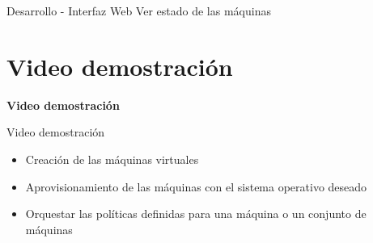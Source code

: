 \begin{frame}{Desarrollo - Interfaz Web}
    \vspace{0cm} {Ver estado de las máquinas}
    \vspace{0cm}
    \begin{figure}[ht]
       \centering
    \end{figure}

\end{frame}


\section{Video demostración}
\begin{frame}
    \Huge
    \centering
    \textbf{Video demostración}

\end{frame}

\begin{frame}{Video demostración}
    \vspace{-1.5cm}
    \begin{itemize}
        \item Creación de las máquinas virtuales
        \item Aprovisionamiento de las máquinas con el sistema operativo deseado
        \item Orquestar las políticas definidas para una máquina o un conjunto de máquinas
    \end{itemize}

\end{frame}


